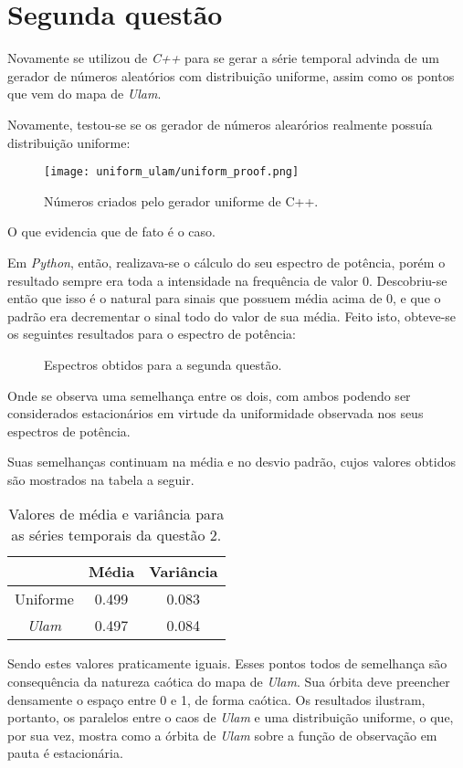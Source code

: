 \documentclass{article}[twocolumn]
\begin{document}
	\section{Segunda quest\~ao}
	Novamente se utilizou de \textit{C++} para se gerar a s\'erie temporal advinda de um
	gerador de n\'umeros aleat\'orios com distribui\c{c}\~ao uniforme, assim como os pontos
	que vem do mapa de \textit{Ulam}.
	
	Novamente, testou-se se os gerador de n\'umeros alear\'orios realmente possu\'ia
	distribui\c{c}\~ao uniforme:
	\begin{figure}[H]
		\centering
		\texttt{[image: uniform\_ulam/uniform\_proof.png]}
		\caption{N\'umeros criados pelo gerador uniforme de C++.}
	\end{figure}
	O que evidencia que de fato \'e o caso.

	Em \textit{Python}, ent\~ao, realizava-se o c\'alculo
	do seu espectro de pot\^encia, por\'em o resultado sempre era toda a intensidade na
	frequ\^encia de valor 0. Descobriu-se ent\~ao que isso \'e o natural para sinais que possuem
	m\'edia acima de 0, e que o padr\~ao era decrementar o sinal todo do valor de sua m\'edia.
	Feito isto, obteve-se os seguintes resultados para o espectro de pot\^encia:
	\begin{figure}[H]
		\centering
		\caption{Espectros obtidos para a segunda quest\~ao.}
	\end{figure}
	Onde se observa uma semelhan\c{c}a entre os dois, com ambos podendo ser considerados
	estacion\'arios em virtude da uniformidade observada nos seus espectros de pot\^encia.

	Suas semelhan\c{c}as continuam na m\'edia e no desvio padr\~ao, cujos valores obtidos
	s\~ao mostrados na tabela a seguir.
	\begin{table}[H]
		\centering
		\begin{tabular}{ccc}
			\hline
			& M\'edia & Vari\^ancia\\
			\hline
			Uniforme & 0.499 & 0.083\\
			\textit{Ulam} & 0.497 & 0.084\\
			\hline
		\end{tabular}
		\caption{Valores de m\'edia e vari\^ancia para as s\'eries temporais da quest\~ao 2.}
	\end{table}
	Sendo estes valores praticamente iguais. Esses pontos todos de semelhan\c{c}a s\~ao
	consequ\^encia da natureza ca\'otica do mapa de \textit{Ulam}. Sua \'orbita deve
	preencher densamente o espa\c{c}o entre 0 e 1, de forma ca\'otica. Os resultados ilustram,
	portanto, os paralelos entre o caos de \textit{Ulam} e uma distribui\c{c}\~ao uniforme, o
	que, por sua vez, mostra como a \'orbita de \textit{Ulam} sobre a fun\c{c}\~ao de
	observa\c{c}\~ao em pauta \'e estacion\'aria.
\end{document}
